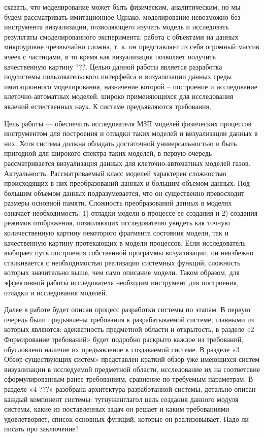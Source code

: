 \documentclass[a4paper,12pt]{extarticle}
\begin{document}
сказать, что моделирование может быть физическим, аналитическим, но мы будем рассматривать имитационное
Однако, моделирование невозможно без инструмента визуализации, позволяющего изучать модель и исследовать результаты смоделированного эксперимента: работа с объектами на данных микроуровне чрезвычайно сложна, т. к. он представляет из себя огромный массив ячеек с частицами, в то время как визуализация позволяет получить качественную картину ???. Целью данной работы является разработка подсистемы пользовательского интерфейса и визуализации данных среды имитационного моделирования, назначение которой – построение и исследование клеточно-автоматных моделей, широко применяющихся для исследования явлений естественных наук. К системе предъявляются требования, 

Цель работы — обеспечить исследователя МЗП моделей физических процессов инструментом для построения и отладки таких моделей и визуализации данных в них. Хотя система должна обладать достаточной универсальностью и быть пригодной для широкого спектра таких моделей, в первую очередь рассматривается визуализация данных для клеточно-автоматных моделей газов. 
Актуальность. Рассматриваемый класс моделей характерен сложностью происходящих в них преобразований данных и большим объемом данных. Под большим объемом данных подразумевается, что он существенно превосходит размеры основной памяти. Сложность преобразований данных в моделях означает необходимость: 1) отладки модели в процессе ее создания и 2) создания режимов отображения, позволяющих исследователю увидеть как точную количественную картину некоторого фрагмента состояния модели, так и качественную картину протекающих в модели процессов. Если исследователь выбирает путь построения собственной программы визуализации, он неизбежно сталкивается с необходимостью реализации системных функций, сложность которых значительно выше, чем само описание модели.  Таком образом, для эффективной работы исследователя необходим инструмент для построения, отладки и исследования моделей.







Далее в работе будет описан процесс разработки системы по этапам. В первую очередь были предъявлены требования к разрабатываемой системе, главными из которых являются: адекватность предметной области и открытость, в разделе «2 Формирование требований» будет подробно раскрыто каждое из требований, обусловлено наличие их предъявление к создаваемой системе. В разделе «3 Обзор существующих систем» представлен краткий обзор уже имеющихся систем визуализации в исследуемой предметной области, исследование их на соответсвие сформулированным ранее требованиям, сравнение по требуемым параметрам. В разделе «4 ???» разобрана архитектура разработанной системы, детально описан каждый компонент системы: тутнуженглагол цель создания данного модуля системы, какие из поставленных задач он решает и каким требованиями удовлетворяет, список основных функций, которые он реализовывает. Надо ли писать про заключение?
\end{document}
